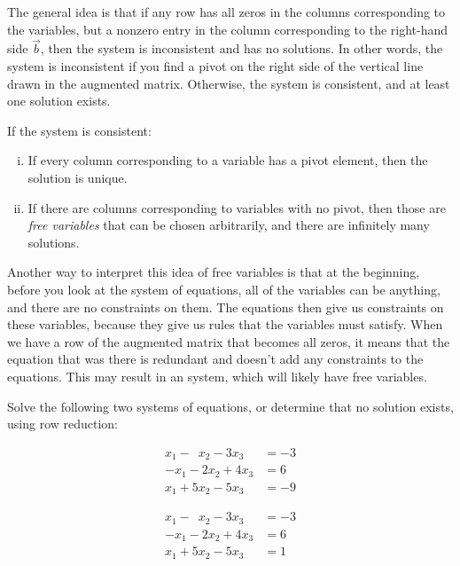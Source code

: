 \medskip

The general idea is that
if any row has all zeros in the columns corresponding to the
variables, but a nonzero entry in the column corresponding to the
right-hand side $\vec{b}$, then the system is inconsistent and has no solutions.
In other words, the system is inconsistent if you find a pivot on the right
side of the vertical line drawn in the augmented matrix.  Otherwise, the
system is consistent, and at least one solution exists.
\pagebreak[2]

If the system is consistent:
\begin{enumerate}[(i)]
\item If every column corresponding to a variable has a pivot element,
then the solution is unique.
\item If there are columns corresponding to variables with no pivot,
then those are \emph{free variables} that can be chosen
arbitrarily, and there are infinitely many solutions.
\end{enumerate}

Another way to interpret this idea of free variables is that at the beginning, before you look at the system of equations, all of the variables can be anything, and there are no constraints on them. The equations then give us constraints on these variables, because they give us rules that the variables must satisfy. When we have a row of the augmented matrix that becomes all zeros, it means that the equation that was there is redundant and doesn't add any constraints to the equations. This may result in an \emph{} system, which will likely have free variables.

\begin{example}
Solve the following two systems of equations, or determine that no solution exists, using row reduction:

\begin{minipage}{0.49\textwidth}
\begin{equation*}
\begin{split}
x_1 - \phantom{9} x_2 - 3x_3 & = -3 \\
-x_1 - 2x_2 + 4x_3 &= 6 \\
x_1 + 5x_2 - 5x_3 &= -9
\end{split}
\end{equation*}
\end{minipage}%
\begin{minipage}{0.49\textwidth}
\begin{equation*}
\begin{split}
x_1 - \phantom{9} x_2 - 3x_3 & = -3 \\
-x_1 - 2x_2 + 4x_3 &= 6 \\
x_1 + 5x_2 - 5x_3 &= 1
\end{split}
\end{equation*}
\end{minipage}
\end{example}

